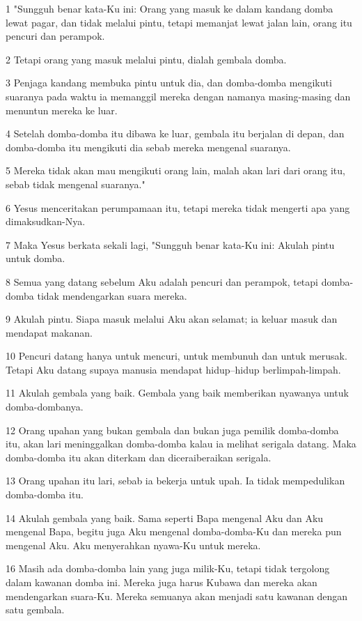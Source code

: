 \par 1 "Sungguh benar kata-Ku ini: Orang yang masuk ke dalam kandang domba lewat pagar, dan tidak melalui pintu, tetapi memanjat lewat jalan lain, orang itu pencuri dan perampok.
\par 2 Tetapi orang yang masuk melalui pintu, dialah gembala domba.
\par 3 Penjaga kandang membuka pintu untuk dia, dan domba-domba mengikuti suaranya pada waktu ia memanggil mereka dengan namanya masing-masing dan menuntun mereka ke luar.
\par 4 Setelah domba-domba itu dibawa ke luar, gembala itu berjalan di depan, dan domba-domba itu mengikuti dia sebab mereka mengenal suaranya.
\par 5 Mereka tidak akan mau mengikuti orang lain, malah akan lari dari orang itu, sebab tidak mengenal suaranya."
\par 6 Yesus menceritakan perumpamaan itu, tetapi mereka tidak mengerti apa yang dimaksudkan-Nya.
\par 7 Maka Yesus berkata sekali lagi, "Sungguh benar kata-Ku ini: Akulah pintu untuk domba.
\par 8 Semua yang datang sebelum Aku adalah pencuri dan perampok, tetapi domba-domba tidak mendengarkan suara mereka.
\par 9 Akulah pintu. Siapa masuk melalui Aku akan selamat; ia keluar masuk dan mendapat makanan.
\par 10 Pencuri datang hanya untuk mencuri, untuk membunuh dan untuk merusak. Tetapi Aku datang supaya manusia mendapat hidup--hidup berlimpah-limpah.
\par 11 Akulah gembala yang baik. Gembala yang baik memberikan nyawanya untuk domba-dombanya.
\par 12 Orang upahan yang bukan gembala dan bukan juga pemilik domba-domba itu, akan lari meninggalkan domba-domba kalau ia melihat serigala datang. Maka domba-domba itu akan diterkam dan diceraiberaikan serigala.
\par 13 Orang upahan itu lari, sebab ia bekerja untuk upah. Ia tidak mempedulikan domba-domba itu.
\par 14 Akulah gembala yang baik. Sama seperti Bapa mengenal Aku dan Aku mengenal Bapa, begitu juga Aku mengenal domba-domba-Ku dan mereka pun mengenal Aku. Aku menyerahkan nyawa-Ku untuk mereka.
\par 16 Masih ada domba-domba lain yang juga milik-Ku, tetapi tidak tergolong dalam kawanan domba ini. Mereka juga harus Kubawa dan mereka akan mendengarkan suara-Ku. Mereka semuanya akan menjadi satu kawanan dengan satu gembala.
